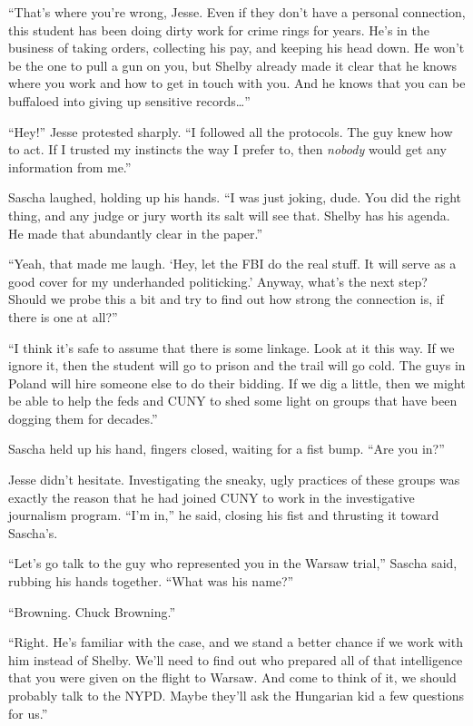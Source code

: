 \documentclass[12pt]{book}
\begin{document}
``That's where you're wrong, Jesse.  Even if they don't have a personal connection, this student has been doing dirty work for crime rings for years.  He's in the business of taking orders, collecting his pay, and keeping his head down.  He won't be the one to pull a gun on you, but Shelby already made it clear that he knows where you work and how to get in touch with you.  And he knows that you can be buffaloed into giving up sensitive records\dots''

``Hey!'' Jesse protested sharply.  ``I followed all the protocols.  The guy knew how to act.  If I trusted my instincts the way I prefer to, then \emph{nobody} would get any information from me.''

Sascha laughed, holding up his hands.  ``I was just joking, dude.  You did the right thing, and any judge or jury worth its salt will see that.  Shelby has his agenda.  He made that abundantly clear in the paper.''

``Yeah, that made me laugh.  `Hey, let the FBI do the real stuff.  It will serve as a good cover for my underhanded politicking.'  Anyway, what's the next step?  Should we probe this a bit and try to find out how strong the connection is, if there is one at all?''

``I think it's safe to assume that there is some linkage.  Look at it this way.  If we ignore it, then the student will go to prison and the trail will go cold.  The guys in Poland will hire someone else to do their bidding.  If we dig a little, then we might be able to help the feds and CUNY to shed some light on groups that have been dogging them for decades.''

Sascha held up his hand, fingers closed, waiting for a fist bump.  ``Are you in?''

Jesse didn't hesitate.  Investigating the sneaky, ugly practices of these groups was exactly the reason that he had joined CUNY to work in the investigative journalism program.  ``I'm in,'' he said, closing his fist and thrusting it toward Sascha's.

``Let's go talk to the guy who represented you in the Warsaw trial,'' Sascha said, rubbing his hands together.  ``What was his name?''

``Browning.  Chuck Browning.''

``Right.  He's familiar with the case, and we stand a better chance if we work with him instead of Shelby.  We'll need to find out who prepared all of that intelligence that you were given on the flight to Warsaw.  And come to think of it, we should probably talk to the NYPD.  Maybe they'll ask the Hungarian kid a few questions for us.''
\end{document}
